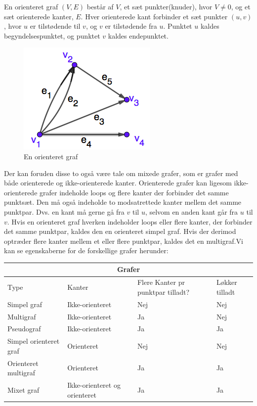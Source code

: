 \begin{definition}
En orienteret graf $(V,E)$ består af $V$, et sæt punkter(knuder), hvor $V\neq0$, og et sæt orienterede kanter, $E$. Hver orienterede kant forbinder et sæt punkter $(u,v)$, hvor $u$ er tilstødende til $v$, og $v$ er tilstødende fra $u$. Punktet $u$ kaldes begyndelsespunktet, og punktet $v$ kaldes endepunktet.
\end{definition}
\begin{figure}[H]
\centering
\includegraphics[scale=0.5]{fig/img/orienteret_graf.png}
\caption{En orienteret graf}
\label{fig:orienteret}
\end{figure}
Der kan foruden disse to også være tale om mixede grafer, som er grafer med både orienterede og ikke-orienterede kanter. Orienterede grafer kan ligesom ikke-orienterede grafer indeholde loops og flere kanter der forbinder det samme punktsæt. Den må også indeholde to modsatrettede kanter mellem det samme punktpar. Dvs. en kant må gerne gå fra $v$ til $u$, selvom en anden kant går fra $u$ til $v$. Hvis en orienteret graf hverken indeholder loops eller flere kanter, der forbinder det samme punktpar, kaldes den en orienteret simpel graf. Hvis der derimod optræder flere kanter mellem et eller flere punktpar, kaldes det en multigraf.Vi kan se egenskaberne for de forskellige grafer herunder:

\begin{tabular}{ |p{4cm}||p{3cm}|p{3cm}|p{2cm}|  }
 \hline
 \multicolumn{4}{|c|}{Grafer} \\
 \hline
 Type & Kanter & Flere Kanter pr punktpar tilladt? & Løkker tilladt\\
 \hline
 Simpel graf   & Ikke-orienteret    & Nej &   Nej\\
 Multigraf &   Ikke-orienteret & Ja   & Nej\\
 Pseudograf & Ikke-orienteret & Ja &  Ja\\
 Simpel orienteret graf    & Orienteret & Nej &  Nej\\
 Orienteret multigraf &  Orienteret  & Ja & Ja\\
 Mixet graf & Ikke-orienteret og orienteret  & Ja   & Ja\\
 \hline
\end{tabular}

